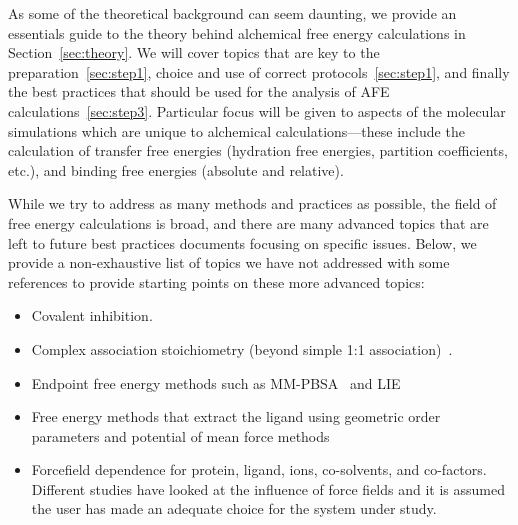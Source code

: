 \documentclass[9pt,bestpractices]{livecoms}
\begin{document}
As some of the theoretical background can seem daunting, we provide an essentials guide to the theory behind alchemical free energy calculations in Section~\ref{sec:theory}.
We will cover topics that are key to the preparation~\ref{sec:step1}, choice and use of correct protocols~\ref{sec:step1}, and finally the best practices that should be used for the analysis of AFE calculations~\ref{sec:step3}. 
Particular focus will be given to aspects of the molecular simulations which are unique to alchemical calculations---these include the calculation of transfer free energies (hydration free energies, partition coefficients, etc.), and binding free energies (absolute and relative).


While we try to address as many methods and practices as possible, the field of free energy calculations is broad, and there are many advanced topics that are left to future best practices documents focusing on specific issues. 
Below, we provide a non-exhaustive list of topics we have not addressed with some references to provide starting points on these more advanced topics:
\begin{itemize}
\item Covalent inhibition.
\item Complex association stoichiometry (beyond simple 1:1 association)~\cite{awesome reference}. 
\item Endpoint free energy methods such as MM-PBSA~\cite{genheden2015mm} and LIE~\cite{gutierrez-de-teran2012linear}
\item Free energy methods that extract the ligand using geometric order parameters and potential of mean force methods~\cite{heinzelmann2017attachpullrelease}
\item Forcefield dependence for protein, ligand, ions, co-solvents, and co-factors. Different studies have looked at the influence of force fields and it is assumed the user has made an adequate choice for the system under study.~\cite{loeffler2018reproducibility, vassetti2019assessment, lopes2015current} 
\end{itemize}
\end{document}
